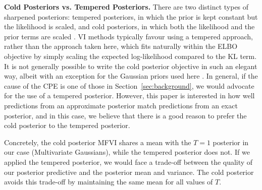 \documentclass{article}
\theoremstyle{plain}
\theoremstyle{definition}
\theoremstyle{remark}
\theoremstyle{plain}
\newcommand{\data}{\mathcal{D}}
\begin{document}
\textbf{Cold Posteriors vs. Tempered Posteriors.} There are two distinct types of sharpened posteriors: tempered posteriors, in which the prior is kept constant but the likelihood is scaled, and cold posteriors, in which both the likelihood and the prior terms are scaled \cite{aitchison2020statistical}. VI methods typically favour using a tempered approach, rather than the approach taken here, which fits naturally within the ELBO objective by simply scaling the expected log-likelihood compared to the KL term. It is not generally possible to write the cold posterior objective in such an elegant way, albeit with an exception for the Gaussian priors used here \cite{aitchison2020statistical}. In general, if the cause of the CPE is one of those in Section~\ref{sec:background}, we would advocate for the use of a tempered posterior. However, this paper is interested in how well predictions from an approximate posterior match predictions from an exact posterior, and in this case, we believe that there is a good reason to prefer the cold posterior to the tempered posterior. 

Concretely, the cold posterior MFVI shares a mean with the $T=1$ posterior in our case (Multivariate Gaussians), while the tempered posterior does not. 
If we applied the tempered posterior, we would face a trade-off between the quality of our posterior predictive and the posterior mean and variance. The cold posterior avoids this trade-off by maintaining the same mean for all values of $T$. 


\end{document}
